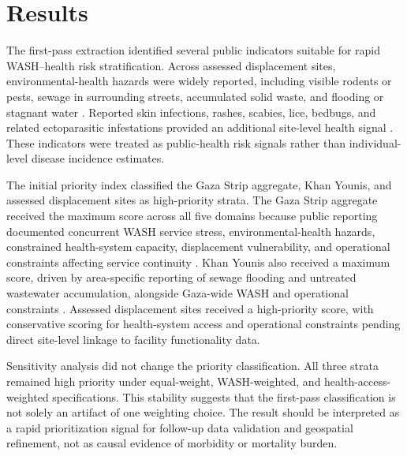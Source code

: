 \section{Results}

The first-pass extraction identified several public indicators suitable for rapid WASH--health risk stratification. Across assessed displacement sites, environmental-health hazards were widely reported, including visible rodents or pests, sewage in surrounding streets, accumulated solid waste, and flooding or stagnant water \citep{ocha_2026_apr17}. Reported skin infections, rashes, scabies, lice, bedbugs, and related ectoparasitic infestations provided an additional site-level health signal \citep{ocha_2026_apr17}. These indicators were treated as public-health risk signals rather than individual-level disease incidence estimates.

The initial priority index classified the Gaza Strip aggregate, Khan Younis, and assessed displacement sites as high-priority strata. The Gaza Strip aggregate received the maximum score across all five domains because public reporting documented concurrent WASH service stress, environmental-health hazards, constrained health-system capacity, displacement vulnerability, and operational constraints affecting service continuity \citep{ocha_2026_apr17,ocha_2026_may15}. Khan Younis also received a maximum score, driven by area-specific reporting of sewage flooding and untreated wastewater accumulation, alongside Gaza-wide WASH and operational constraints \citep{ocha_2026_may15}. Assessed displacement sites received a high-priority score, with conservative scoring for health-system access and operational constraints pending direct site-level linkage to facility functionality data.

Sensitivity analysis did not change the priority classification. All three strata remained high priority under equal-weight, WASH-weighted, and health-access-weighted specifications. This stability suggests that the first-pass classification is not solely an artifact of one weighting choice. The result should be interpreted as a rapid prioritization signal for follow-up data validation and geospatial refinement, not as causal evidence of morbidity or mortality burden.
